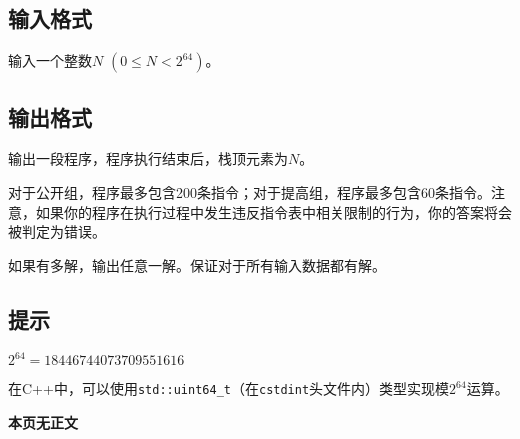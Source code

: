 \subsection*{输入格式}

输入一个整数$N$ $(0 \leq N < 2^{64})$。

\subsection*{输出格式}

输出一段程序，程序执行结束后，栈顶元素为$N$。

对于公开组，程序最多包含200条指令；对于提高组，程序最多包含60条指令。注意，如果你的程序在执行过程中发生违反指令表中相关限制的行为，你的答案将会被判定为错误。

如果有多解，输出任意一解。保证对于所有输入数据都有解。

\setcounter{ExampleNo}{0}


\subsection*{提示}

$2^{64} = 18 446 744 073 709 551 616$

在C++中，可以使用\verb|std::uint64_t|（在\texttt{cstdint}头文件内）类型实现模$2^{64}$运算。

\clearpage

\ifodd\value{page}
\else
    \vspace*{\fill}
    \begin{center}
    \textbf{\Large 本页无正文}
    \end{center}
    \vspace*{\fill}
    \clearpage
\fi

